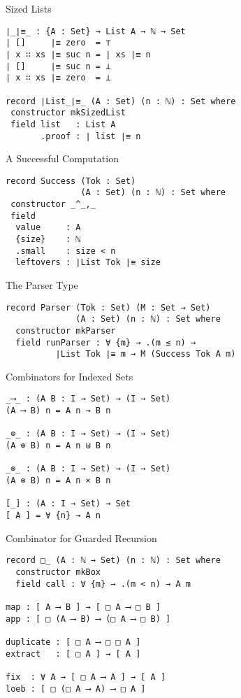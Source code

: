 \documentclass{beamer}
\begin{document}
\begin{frame}[fragile]{Sized Lists}
\begin{verbatim}
∣_∣≡_ : {A : Set} → List A → ℕ → Set
∣ []     ∣≡ zero  = ⊤
∣ x ∷ xs ∣≡ suc n = ∣ xs ∣≡ n
∣ []     ∣≡ suc n = ⊥
∣ x ∷ xs ∣≡ zero  = ⊥

record ∣List_∣≡_ (A : Set) (n : ℕ) : Set where
 constructor mkSizedList
 field list   : List A
       .proof : ∣ list ∣≡ n
\end{verbatim}
\end{frame}


\begin{frame}[fragile]{A Successful Computation}
\begin{verbatim}
record Success (Tok : Set)
               (A : Set) (n : ℕ) : Set where
 constructor _^_,_
 field
  value     : A
  {size}    : ℕ
  .small    : size < n
  leftovers : ∣List Tok ∣≡ size
\end{verbatim}
\end{frame}


\begin{frame}[fragile]{The Parser Type}
\begin{verbatim}
record Parser (Tok : Set) (M : Set → Set)
              (A : Set) (n : ℕ) : Set where
  constructor mkParser
  field runParser : ∀ {m} → .(m ≤ n) →
          ∣List Tok ∣≡ m → M (Success Tok A m)
\end{verbatim}
\end{frame}

\begin{frame}[fragile]{Combinators for Indexed Sets}
\begin{verbatim}
_⟶_ : (A B : I → Set) → (I → Set)
(A ⟶ B) n = A n → B n

_⊕_ : (A B : I → Set) → (I → Set)
(A ⊕ B) n = A n ⊎ B n

_⊗_ : (A B : I → Set) → (I → Set)
(A ⊗ B) n = A n × B n

[_] : (A : I → Set) → Set
[ A ] = ∀ {n} → A n
\end{verbatim}
\end{frame}


\begin{frame}[fragile]{Combinator for Guarded Recursion}
\begin{verbatim}
record □_ (A : ℕ → Set) (n : ℕ) : Set where
  constructor mkBox
  field call : ∀ {m} → .(m < n) → A m

map : [ A ⟶ B ] → [ □ A ⟶ □ B ]
app : [ □ (A ⟶ B) ⟶ (□ A ⟶ □ B) ]

duplicate : [ □ A ⟶ □ □ A ]
extract   : [ □ A ] → [ A ]

fix  : ∀ A → [ □ A ⟶ A ] → [ A ]
loeb : [ □ (□ A ⟶ A) ⟶ □ A ]
\end{verbatim}
\end{frame}
\end{document}
